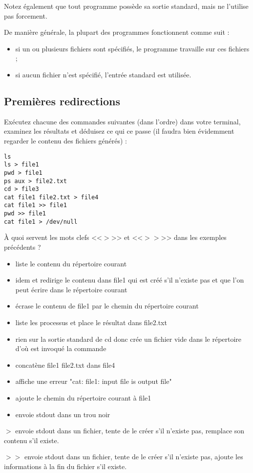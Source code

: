 \documentclass[11pt]{article}
\begin{document}
Notez également que tout programme possède sa sortie standard, mais ne l’utilise pas forcement.

De manière générale, la plupart des programmes fonctionnent comme suit :

\begin{itemize}
 \item si un ou plusieurs fichiers sont spécifiés, le programme travaille sur ces fichiers ;
 \item si aucun fichier n'est spécifié, l'entrée standard est utilisée.
\end{itemize}

\subsection{Premières redirections}

Exécutez chacune des commandes suivantes (dans l’ordre) dans votre terminal, examinez les résultats et déduisez ce qui ce passe 
(il faudra bien évidemment regarder le contenu des fichiers générés) :

\begin{lstlisting}
ls
ls > file1
pwd > file1
ps aux > file2.txt
cd > file3
cat file1 file2.txt > file4
cat file1 >> file1
pwd >> file1
cat file1 > /dev/null
\end{lstlisting}

À quoi servent les mots clefs <<$>$>> et <<$>>$>> dans les exemples précédents ?

\begin{solution}
 \begin{itemize}
  \item liste le contenu du répertoire courant
  \item idem et redirige le contenu dans file1 qui est créé s'il n'existe pas et que l'on peut écrire dans le répertoire courant
  \item écrase le contenu de file1 par le chemin du répertoire courant
  \item liste les processus et place le résultat dans file2.txt
  \item rien sur la sortie standard de cd donc crée un fichier vide dans le répertoire d'où est invoqué la commande
  \item concatène file1 file2.txt dans file4
  \item affiche une erreur "cat: file1: input file is output file"
  \item ajoute le chemin du répertoire courant à file1
  \item envoie stdout dans un trou noir
 \end{itemize}

 $>$ envoie stdout dans un fichier, tente de le créer s'il n'existe pas, remplace son contenu s'il existe.

 $>>$ envoie stdout dans un fichier, tente de le créer s'il n'existe pas, ajoute les informations à la fin du fichier s'il existe.
 
\end{solution}
\end{document}
